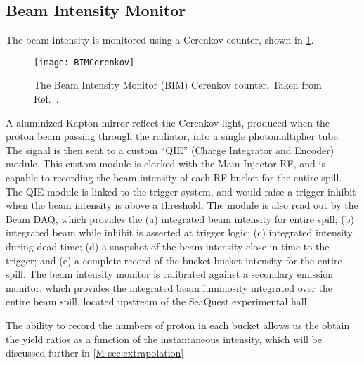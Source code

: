 \documentclass[../main.tex]{subfiles}
\begin{document}
\subsection{Beam Intensity Monitor}
\label{subsec:BIM}
The beam intensity is monitored using a Cerenkov counter, shown in \cref{fig:BIM}.
\begin{figure}[htbp!]
	\centering
	\texttt{[image: BIMCerenkov]}
	\caption{The Beam Intensity Monitor (BIM) Cerenkov counter. Taken from Ref.\
		\cite{aidala2019}.}
	\label{fig:BIM}
\end{figure}
A aluminized Kapton mirror reflect the Cerenkov light, produced when the proton beam
passing through the radiator, into a single photomultiplier tube. The signal is then
sent to a custom ``QIE'' (Charge Integrator and Encoder) module. This custom module
is clocked with the Main Injector RF, and is capable to recording the beam intensity
of each RF bucket for the entire spill. The QIE module is linked to the trigger
system, and would raise a trigger inhibit when the beam intensity is above a
threshold. The module is also read out by the Beam DAQ, which provides the (a)
integrated beam intensity for entire spill; (b) integrated beam while inhibit is
asserted at trigger logic; (c) integrated intensity during dead time; (d) a snapshot
of the beam intensity close in time to the trigger; and (e) a complete record of the
bucket-bucket intensity for the entire spill. The beam intensity monitor is calibrated
against a secondary emission monitor, which provides the integrated beam luminosity
integrated over the entire beam spill, located upstream of the SeaQuest experimental hall.

The ability to record the numbers of proton in each bucket allows us the obtain the
yield ratios as a function of the instantaneous intensity, which will be discussed
further in \cref{M-sec:extrapolation}
\end{document}
